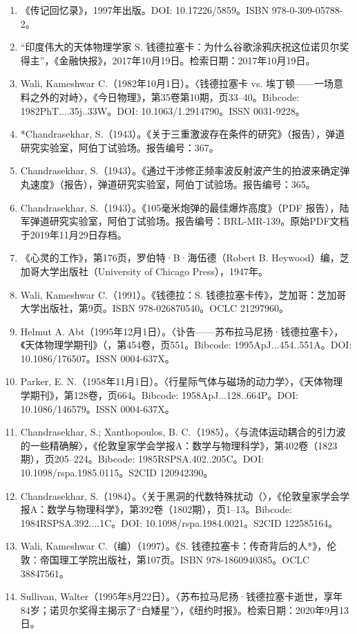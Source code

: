 \begin{enumerate}
\item 《传记回忆录》，1997年出版。DOI: 10.17226/5859。ISBN 978-0-309-05788-2。
\item “印度伟大的天体物理学家 S. 钱德拉塞卡：为什么谷歌涂鸦庆祝这位诺贝尔奖得主”，《金融快报》，2017年10月19日。检索日期：2017年10月19日。
\item Wali, Kameshwar C.（1982年10月1日）。〈钱德拉塞卡 vs. 埃丁顿——一场意料之外的对峙〉，《今日物理》，第35卷第10期，页33–40。Bibcode: 1982PhT....35j..33W。DOI: 10.1063/1.2914790。ISSN 0031-9228。
\item *Chandrasekhar, S.（1943）。《关于三重激波存在条件的研究》（报告），弹道研究实验室，阿伯丁试验场。报告编号：367。
\item Chandrasekhar, S.（1943）。《通过干涉修正频率波反射波产生的拍波来确定弹丸速度》（报告），弹道研究实验室，阿伯丁试验场。报告编号：365。
\item Chandrasekhar, S.（1943）。《105毫米炮弹的最佳爆炸高度》（PDF 报告），陆军弹道研究实验室，阿伯丁试验场。报告编号：BRL-MR-139。原始PDF文档于2019年11月29日存档。
\item 《心灵的工作》，第176页，罗伯特·B·海伍德（Robert B. Heywood）编，芝加哥大学出版社（University of Chicago Press），1947年。
\item Wali, Kameshwar C.（1991）。《钱德拉：S. 钱德拉塞卡传》，芝加哥：芝加哥大学出版社，第9页。ISBN 978-026870540。OCLC 21297960。
\item Helmut A. Abt（1995年12月1日）。〈讣告——苏布拉马尼扬·钱德拉塞卡〉，《天体物理学期刊》（，第454卷，页551。Bibcode: 1995ApJ...454..551A。DOI: 10.1086/176507。ISSN 0004-637X。
\item Parker, E. N.（1958年11月1日）。〈行星际气体与磁场的动力学〉，《天体物理学期刊》，第128卷，页664。Bibcode: 1958ApJ...128..664P。DOI: 10.1086/146579。ISSN 0004-637X。
\item Chandrasekhar, S.; Xanthopoulos, B. C.（1985）。〈与流体运动耦合的引力波的一些精确解〉，《伦敦皇家学会学报A：数学与物理科学》，第402卷（1823期），页205–224。Bibcode: 1985RSPSA.402..205C。DOI: 10.1098/rspa.1985.0115。S2CID 120942390。
\item Chandrasekhar, S.（1984）。〈关于黑洞的代数特殊扰动（〉，《伦敦皇家学会学报A：数学与物理科学》，第392卷（1802期），页1–13。Bibcode: 1984RSPSA.392....1C。DOI: 10.1098/rspa.1984.0021。S2CID 122585164。
\item Wali, Kameshwar C.（编）（1997）。《S. 钱德拉塞卡：传奇背后的人*》，伦敦：帝国理工学院出版社，第107页。ISBN 978-1860940385。OCLC 38847561。
\item Sullivan, Walter（1995年8月22日）。〈苏布拉马尼扬·钱德拉塞卡逝世，享年84岁；诺贝尔奖得主揭示了“白矮星”〉，《纽约时报》。检索日期：2020年9月13日。

\end{enumerate}
